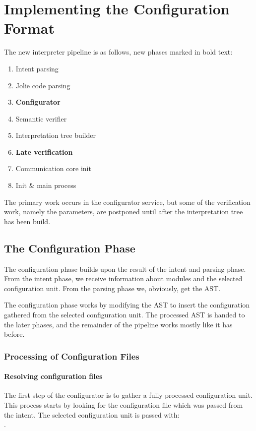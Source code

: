 \section{Implementing the Configuration Format}
\label{sec:col_impl}

The new interpreter pipeline is as follows, new phases marked in bold text:

\begin{enumerate}
\item Intent parsing
\item Jolie code parsing
\item \textbf{Configurator}
\item Semantic verifier
\item Interpretation tree builder
\item \textbf{Late verification}
\item Communication core init
\item Init \& main process
\end{enumerate}

The primary work occurs in the configurator service, but some of the
verification work, namely the parameters, are postponed until after the
interpretation tree has been build.

\subsection{The Configuration Phase}

The configuration phase builds upon the result of the intent and parsing phase.
From the intent phase, we receive information about modules and the selected
configuration unit. From the parsing phase we, obviously, get the AST.

The configuration phase works by modifying the AST to insert the configuration
gathered from the selected configuration unit. The processed AST is handed to
the later phases, and the remainder of the pipeline works mostly like it has
before.

\subsubsection*{Processing of Configuration Files}

\paragraph{Resolving configuration files}

The first step of the configurator is to gather a fully processed configuration
unit. This process starts by looking for the configuration file which was
passed from the intent. The selected configuration unit is passed with:
\\.

